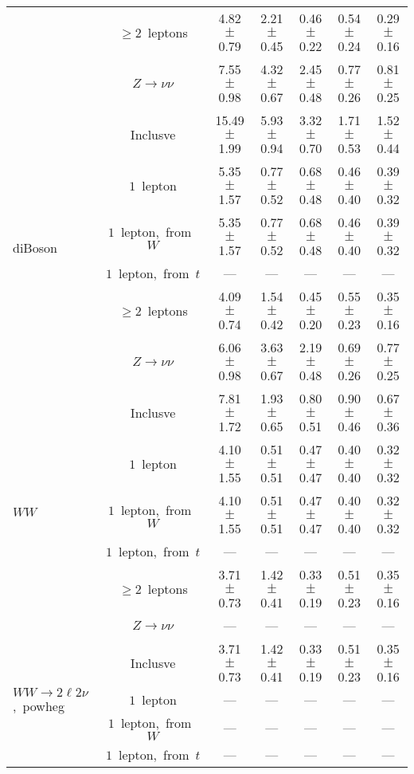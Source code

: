 \documentclass{article}
\begin{document}
\begin{longtable}{|l|c|c|c|c|c|c|}
 & $\ge2$~leptons  & 4.82 $\pm$ 0.79  & 2.21 $\pm$ 0.45  & 0.46 $\pm$ 0.22  & 0.54 $\pm$ 0.24  & 0.29 $\pm$ 0.16 \\* 
 & $Z\rightarrow\nu\nu$  & 7.55 $\pm$ 0.98  & 4.32 $\pm$ 0.67  & 2.45 $\pm$ 0.48  & 0.77 $\pm$ 0.26  & 0.81 $\pm$ 0.25 \\* 
\hline 
\multirow{6}{*}{diBoson} & Inclusve  & 15.49 $\pm$ 1.99  & 5.93 $\pm$ 0.94  & 3.32 $\pm$ 0.70  & 1.71 $\pm$ 0.53  & 1.52 $\pm$ 0.44 \\* 
 & $1$~lepton  & 5.35 $\pm$ 1.57  & 0.77 $\pm$ 0.52  & 0.68 $\pm$ 0.48  & 0.46 $\pm$ 0.40  & 0.39 $\pm$ 0.32 \\* 
 & $1$~lepton,~from~$W$  & 5.35 $\pm$ 1.57  & 0.77 $\pm$ 0.52  & 0.68 $\pm$ 0.48  & 0.46 $\pm$ 0.40  & 0.39 $\pm$ 0.32 \\* 
 & $1$~lepton,~from~$t$  & ---  & ---  & ---  & ---  & --- \\* 
 & $\ge2$~leptons  & 4.09 $\pm$ 0.74  & 1.54 $\pm$ 0.42  & 0.45 $\pm$ 0.20  & 0.55 $\pm$ 0.23  & 0.35 $\pm$ 0.16 \\* 
 & $Z\rightarrow\nu\nu$  & 6.06 $\pm$ 0.98  & 3.63 $\pm$ 0.67  & 2.19 $\pm$ 0.48  & 0.69 $\pm$ 0.26  & 0.77 $\pm$ 0.25 \\* 
\hline 
\multirow{6}{*}{$WW$} & Inclusve  & 7.81 $\pm$ 1.72  & 1.93 $\pm$ 0.65  & 0.80 $\pm$ 0.51  & 0.90 $\pm$ 0.46  & 0.67 $\pm$ 0.36 \\* 
 & $1$~lepton  & 4.10 $\pm$ 1.55  & 0.51 $\pm$ 0.51  & 0.47 $\pm$ 0.47  & 0.40 $\pm$ 0.40  & 0.32 $\pm$ 0.32 \\* 
 & $1$~lepton,~from~$W$  & 4.10 $\pm$ 1.55  & 0.51 $\pm$ 0.51  & 0.47 $\pm$ 0.47  & 0.40 $\pm$ 0.40  & 0.32 $\pm$ 0.32 \\* 
 & $1$~lepton,~from~$t$  & ---  & ---  & ---  & ---  & --- \\* 
 & $\ge2$~leptons  & 3.71 $\pm$ 0.73  & 1.42 $\pm$ 0.41  & 0.33 $\pm$ 0.19  & 0.51 $\pm$ 0.23  & 0.35 $\pm$ 0.16 \\* 
 & $Z\rightarrow\nu\nu$  & ---  & ---  & ---  & ---  & --- \\* 
\hline 
\multirow{6}{*}{$WW{\rightarrow}2\ell2\nu$,~powheg} & Inclusve  & 3.71 $\pm$ 0.73  & 1.42 $\pm$ 0.41  & 0.33 $\pm$ 0.19  & 0.51 $\pm$ 0.23  & 0.35 $\pm$ 0.16 \\* 
 & $1$~lepton  & ---  & ---  & ---  & ---  & --- \\* 
 & $1$~lepton,~from~$W$  & ---  & ---  & ---  & ---  & --- \\* 
 & $1$~lepton,~from~$t$  & ---  & ---  & ---  & ---  & --- \\* 

\end{longtable}
\end{document}
